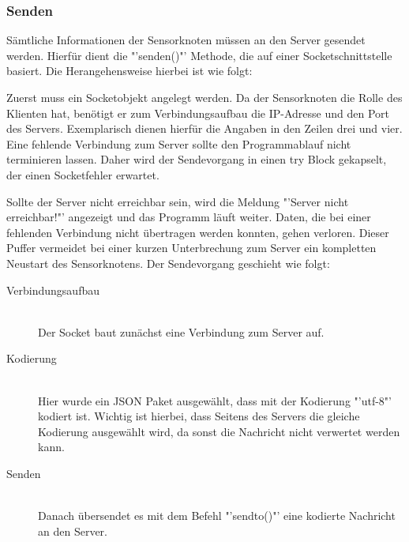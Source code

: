 \subsubsection*{Senden}\label{Sensorknoten:Senden}
	Sämtliche Informationen der Sensorknoten müssen an den Server gesendet werden. Hierfür dient die "'senden()"' Methode, die auf einer Socketschnittstelle basiert. Die Herangehensweise hierbei ist wie folgt:
	
	Zuerst muss ein Socketobjekt angelegt werden. Da der Sensorknoten die Rolle des Klienten hat, benötigt er zum Verbindungsaufbau die IP-Adresse und den Port des Servers. Exemplarisch dienen hierfür die Angaben in den Zeilen drei und vier. Eine fehlende Verbindung zum Server sollte den Programmablauf nicht terminieren lassen. Daher wird der Sendevorgang in einen try Block gekapselt, der einen Socketfehler erwartet. 
	
	Sollte der Server nicht erreichbar sein, wird die Meldung "'Server nicht erreichbar!"' angezeigt und das Programm läuft weiter. Daten, die bei einer fehlenden Verbindung nicht übertragen werden konnten, gehen verloren. Dieser Puffer vermeidet bei einer kurzen Unterbrechung zum Server ein kompletten Neustart des Sensorknotens. Der Sendevorgang geschieht wie folgt: 
	\begin{description}
		\item [Verbindungsaufbau] \hfill \\
			Der Socket baut zunächst eine Verbindung zum Server auf.
		\item [Kodierung] \hfill \\
			Hier wurde ein JSON Paket ausgewählt, dass mit der Kodierung "'utf-8"' kodiert ist.  Wichtig ist hierbei, dass Seitens des Servers die gleiche Kodierung ausgewählt wird, da sonst die Nachricht nicht verwertet werden kann.
		\item  [Senden] \hfill \\
			Danach übersendet es mit dem Befehl "'sendto()"' eine kodierte Nachricht an den Server.
	
	\end{description}
	  
